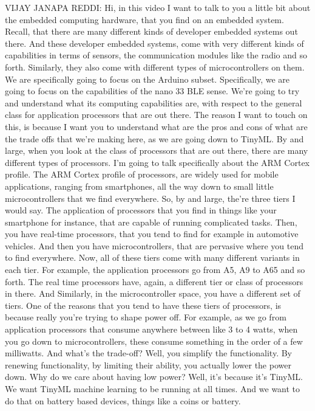 VIJAY JANAPA REDDI: Hi, in this video I want to talk to you a little bit about the embedded computing hardware, that you find on an embedded system. Recall, that there are many different kinds of developer embedded systems out there.
And these developer embedded systems, come with very different kinds of capabilities in terms of sensors, the communication modules like the radio and so forth.
Similarly, they also come with different types of microcontrollers on them.
We are specifically going to focus on the Arduino subset.
Specifically, we are going to focus on the capabilities of the nano 33 BLE sense.
We're going to try and understand what its computing capabilities are, with respect to the general class for application processors that are out there.
The reason I want to touch on this, is because I want you to understand what are the pros and cons of what are the trade offs that we're making here, as we are going down to TinyML.
By and large, when you look at the class of processors that are out there, there are many different types of processors.
I'm going to talk specifically about the ARM Cortex profile.
The ARM Cortex profile of processors, are widely used for mobile applications, ranging from smartphones, all the way down to small little microcontrollers that we find everywhere.
So, by and large, the're three tiers I would say.
The application of processors that you find in things like your smartphone for instance, that are capable of running complicated tasks.
Then, you have real-time processors, that you tend to find for example in automotive vehicles.
And then you have microcontrollers, that are pervasive where you tend to find everywhere.
Now, all of these tiers come with many different variants in each tier.
For example, the application processors go from A5, A9 to A65 and so forth.
The real time processors have, again, a different tier or class of processors in there.
And Similarly, in the microcontroller space, you have a different set of tiers.
One of the reasons that you tend to have these tiers of processors, is because really you're trying to shape power off.
For example, as we go from application processors that consume anywhere between like 3 to 4 watts, when you go down to microcontrollers, these consume something in the order of a few milliwatts.
And what's the trade-off?
Well, you simplify the functionality.
By renewing functionality, by limiting their ability, you actually lower the power down.
Why do we care about having low power?
Well, it's because it's TinyML.
We want TinyML machine learning to be running at all times.
And we want to do that on battery based devices, things like a coins or battery.
